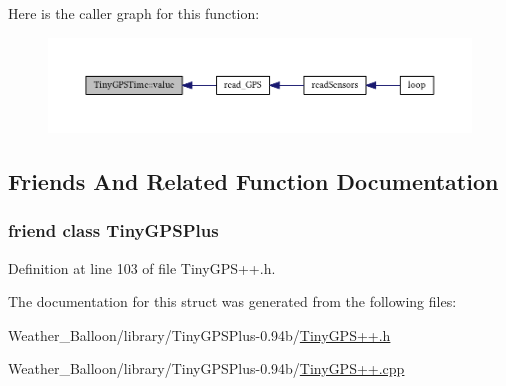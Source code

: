 Here is the caller graph for this function\+:\nopagebreak
\begin{figure}[H]
\begin{center}
\leavevmode
\includegraphics[width=350pt]{struct_tiny_g_p_s_time_afcdb632fee9d144b1414c9d7b95719f1_icgraph}
\end{center}
\end{figure}




\subsection{Friends And Related Function Documentation}
\subsubsection[{\texorpdfstring{Tiny\+G\+P\+S\+Plus}{TinyGPSPlus}}]{\setlength{\rightskip}{0pt plus 5cm}friend class {\bf Tiny\+G\+P\+S\+Plus}\hspace{0.3cm}{\ttfamily [friend]}}\hypertarget{struct_tiny_g_p_s_time_a6501fd5ef19ae166d43e0e5781609ee2}{}\label{struct_tiny_g_p_s_time_a6501fd5ef19ae166d43e0e5781609ee2}


Definition at line 103 of file Tiny\+G\+P\+S++.\+h.



The documentation for this struct was generated from the following files\+:\begin{DoxyCompactItemize}
\item 
Weather\+\_\+\+Balloon/library/\+Tiny\+G\+P\+S\+Plus-\/0.\+94b/\hyperlink{_tiny_g_p_s_09_09_8h}{Tiny\+G\+P\+S++.\+h}\item 
Weather\+\_\+\+Balloon/library/\+Tiny\+G\+P\+S\+Plus-\/0.\+94b/\hyperlink{_tiny_g_p_s_09_09_8cpp}{Tiny\+G\+P\+S++.\+cpp}\end{DoxyCompactItemize}
